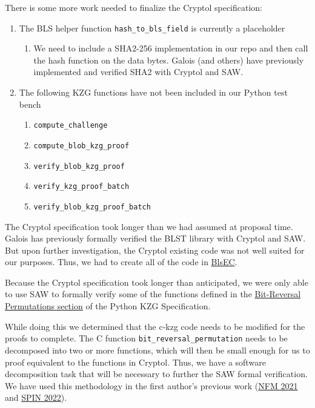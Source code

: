 \documentclass[12pt]{galois-whitepaper}
\begin{document}
There is some more work needed to finalize the Cryptol specification:
\begin{enumerate}
    \item The BLS helper function \texttt{hash\_to\_bls\_field} is currently a placeholder
          \begin{enumerate}
                \item We need to include a SHA2-256 implementation in our repo and then call the hash function on the data bytes.
                      Galois (and others) have previously implemented and verified SHA2 with Cryptol and SAW.
          \end{enumerate}
    \item The following KZG functions have not been included in our Python test bench
          \begin{enumerate}
                \item \texttt{compute\_challenge}
                \item \texttt{compute\_blob\_kzg\_proof}
                \item \texttt{verify\_blob\_kzg\_proof}
                \item \texttt{verify\_kzg\_proof\_batch}
                \item \texttt{verify\_blob\_kzg\_proof\_batch}
          \end{enumerate}
\end{enumerate}

The Cryptol specification took longer than we had assumed at proposal time.
Galois has previously formally verified the BLST library with Cryptol and SAW.
But upon further investigation, the Cryptol existing code was not well suited for
our purposes. Thus, we had to create all of the code in
\href{https://github.com/GaloisInc/ckzg-eip-4844-verification/tree/main/spec/Spec/BlsEC}{BlsEC}.

Because the Cryptol specification took longer than anticipated, we were only able to use SAW to formally verify
some of the functions defined in the \href{https://github.com/ethereum/consensus-specs/blob/dev/specs/deneb/polynomial-commitments.md\#bit-reversal-permutation}{Bit-Reversal Permutations section}
of the Python KZG Specification.

While doing this we determined that the c-kzg code needs to be modified for the proofs to complete.
The C function \texttt{bit\_reversal\_permutation} needs to be decomposed into two or more functions,
which will then be small enough for us to proof equivalent to the functions in Cryptol. Thus, we have
a software decomposition task that will be necessary to further the SAW formal verification. We have used this
methodology in the first author's previous work (\href{https://link.springer.com/chapter/10.1007/978-3-030-76384-8_5}{NFM 2021} and
\href{https://link.springer.com/chapter/10.1007/978-3-031-15077-7_6}{SPIN 2022}).
\end{document}
